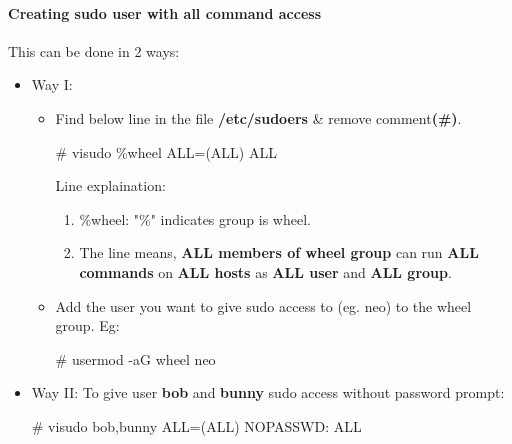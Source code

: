 \begin{flushleft}
	\paragraph{Creating sudo user with all command access}
	This can be done in 2 ways:
	\begin{itemize}
		\item Way I:
		\begin{itemize}
			\item Find below line in the file \textbf{/etc/sudoers} \& remove comment\textbf{(\#)}.
			\begin{tcolorbox}[breakable,notitle,boxrule=-0pt,colback=black,colframe=black]
				\color{green}
				\font=9pt
				\# visudo
				\newline
				\color{white}
				\%wheel ALL=(ALL) ALL
				\font=4pt
			\end{tcolorbox}
			Line explaination:
			\begin{enumerate}
				\item \%wheel: "\%" indicates group is wheel.
				\item The line means, \textbf{ALL members of wheel group} can run \textbf{ALL commands} on \textbf{ALL hosts} as \textbf{ALL user} and \textbf{ALL group}. 
			\end{enumerate}
			\item Add the user you want to give sudo access to (eg. neo) to the wheel group.
			\newline
			Eg:
			\bigskip
			\begin{tcolorbox}[breakable,notitle,boxrule=-0pt,colback=black,colframe=black]
				\color{green}
				\font=9pt
				\# usermod -aG wheel neo
				\font=4pt
			\end{tcolorbox}
		\end{itemize}
		\bigskip
		\item Way II:
		\newline
		To give user \textbf{bob} and \textbf{bunny} sudo access without password prompt:
		\bigskip
		\begin{tcolorbox}[breakable,notitle,boxrule=-0pt,colback=black,colframe=black]
			\color{green}
			\font=9pt
			\# visudo
			\newline
			\color{white}
			bob,bunny ALL=(ALL) NOPASSWD: ALL
			\font=4pt
		\end{tcolorbox}
		\end{itemize}
	
	\newpage
	

\end{flushleft}
